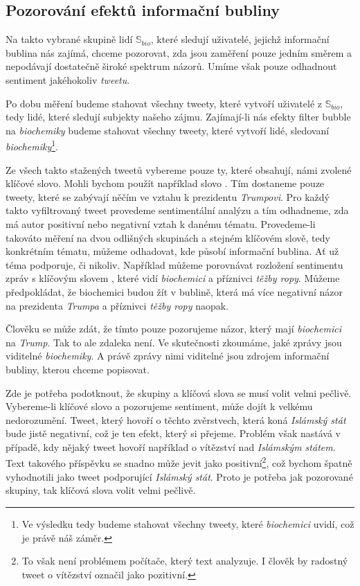 \documentclass[12pt, a4paper]{article}
\numberwithin{equation}{section} 	%
\begin{document}
\subsection{Pozorování efektů informační bubliny}
\noindent Na takto vybrané skupině lidí $\mathbb{S}_{bio}$, které sledují uživatelé, jejichž informační bublina nás zajímá, chceme pozorovat, zda jsou zaměření pouze jedním směrem a nepodávají dostatečně široké spektrum názorů. Umíme však pouze odhadnout sentiment jakéhokoliv \textit{tweetu}.

Po dobu měření budeme stahovat všechny tweety, které vytvoří uživatelé z $\mathbb{S}_{bio}$, tedy lidé, které sledují subjekty našeho zájmu. Zajímají-li nás efekty filter bubble na \textit{biochemiky} budeme stahovat všechny tweety, které vytvoří lidé, sledovaní \textit{biochemiky}\footnote{Ve výsledku tedy budeme stahovat všechny tweety, které \textit{biochemici} uvidí, což je právě náš záměr.}.

Ze všech takto stažených tweetů vybereme pouze ty, které obsahují, námi zvolené klíčové slovo. Mohli bychom použít například slovo \textit{}. Tím dostaneme pouze tweety, které se zabývají něčím ve vztahu k prezidentu \textit{Trumpovi}. Pro každý takto vyfiltrovaný tweet provedeme sentimentální analýzu a tím odhadneme, zda má autor positivní nebo negativní vztah k danému tématu. Provedeme-li takováto měření na dvou odlišných skupinách a stejném klíčovém slově, tedy konkrétním tématu, můžeme odhadovat, kde působí informační bublina. Ať už téma podporuje, či nikoliv. Například můžeme porovnávat rozložení sentimentu zpráv s klíčovým slovem \textit{}, které vidí \textit{biochemici} a příznivci \textit{těžby ropy}. Můžeme předpokládat, že biochemici budou žít v bublině, která má více negativní názor na prezidenta \textit{Trumpa} a příznivci \textit{těžby ropy} naopak.

Člověku se může zdát, že tímto pouze pozorujeme názor, který mají \textit{biochemici} na \textit{Trump}. Tak to ale zdaleka není. Ve skutečnosti zkoumáme, jaké zprávy jsou viditelné \textit{biochemiky}. A právě zprávy nimi viditelné jsou zdrojem informační bubliny, kterou chceme popisovat.

Zde je potřeba podotknout, že skupiny a klíčová slova se musí volit velmi pečlivě. Vybereme-li klíčové slovo \textit{} a pozorujeme sentiment, může dojít k velkému nedorozumění. Tweet, který hovoří o těchto zvěrstvech, která koná \textit{Islámský stát} bude jistě negativní, což je ten efekt, který si přejeme. Problém však nastává v případě, kdy nějaký tweet hovoří například o vítězství nad \textit{Islámským státem}. Text takového příspěvku se snadno může jevit jako positivní\footnote{To však není problémem počítače, který text analyzuje. I člověk by radostný tweet o vítězství označil jako pozitivní.}, což bychom špatně vyhodnotili jako tweet podporující \textit{Islámský stát}. Proto je potřeba jak pozorované skupiny, tak klíčová slova volit velmi pečlivě.
\end{document}

